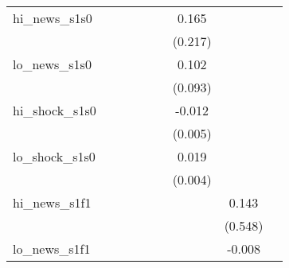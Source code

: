 {\begin{tabular}{l*{8}{c}}
\addlinespace
hi\_news\_s1s0&                     &                     &                     &                     &                     &       0.165         &                     &                     \\
            &                     &                     &                     &                     &                     &     (0.217)         &                     &                     \\
\addlinespace
lo\_news\_s1s0&                     &                     &                     &                     &                     &       0.102         &                     &                     \\
            &                     &                     &                     &                     &                     &     (0.093)         &                     &                     \\
\addlinespace
hi\_shock\_s1s0&                     &                     &                     &                     &                     &      -0.012\sym{**} &                     &                     \\
            &                     &                     &                     &                     &                     &     (0.005)         &                     &                     \\
\addlinespace
lo\_shock\_s1s0&                     &                     &                     &                     &                     &       0.019\sym{***}&                     &                     \\
            &                     &                     &                     &                     &                     &     (0.004)         &                     &                     \\
\addlinespace
hi\_news\_s1f1&                     &                     &                     &                     &                     &                     &       0.143         &                     \\
            &                     &                     &                     &                     &                     &                     &     (0.548)         &                     \\
\addlinespace
lo\_news\_s1f1&                     &                     &                     &                     &                     &                     &      -0.008         &                     \\

\end{tabular}}
